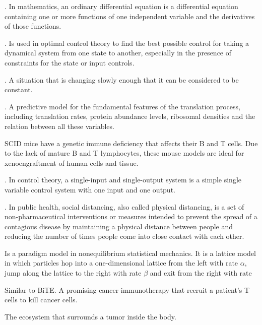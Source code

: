 \begin{acronym}
	.
	In mathematics, an ordinary differential equation is a differential equation containing one or more functions of one independent variable and the derivatives of those functions.
	
	.
	Is used in optimal control theory to find the best possible control for taking a dynamical system from one state to another, especially in the presence of constraints for the state or input controls.
	
	.
	A situation that is changing slowly enough that it can be considered to be constant.
	
	.
	A predictive model for the fundamental features of the translation process, including translation rates, protein abundance levels, ribosomal densities and the relation between all these variables.
	
	SCID mice have a genetic immune deficiency that affects their B and T cells. Due to the lack of mature B and T lymphocytes, these mouse models are ideal for xenoengraftment of human cells and tissue.

	.
	In control theory, a single-input and single-output system is a simple single variable control system with one input and one output.
	
	.
	In public health, social distancing, also called physical distancing, is a set of non-pharmaceutical interventions or measures intended to prevent the spread of a contagious disease by maintaining a physical distance between people and reducing the number of times people come into close contact with each other.
	
	Is a paradigm model in nonequilibrium statistical mechanics. It is a lattice model in which particles hop into a one-dimensional lattice from the left with rate $\alpha$, jump along the lattice to the right with rate $\beta$ and exit from the right with rate 
	
	Similar to BiTE. A promising cancer immunotherapy that recruit a patient's T cells to kill cancer cells. 
	
	The ecosystem that surrounds a tumor inside the body.
	
	
\end{acronym}
